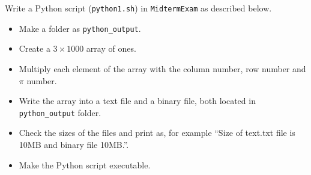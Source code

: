 \question[25]

Write a Python script (\texttt{python1.sh}) in \texttt{MidtermExam} as described below.
\begin{itemize}
\item Make a folder as \texttt{python\_output}.
\item Create a $3\times1000$ array of ones.
\item Multiply each element of the array with the column number, row number and $\pi$ number.
\item Write the array into a text file and a binary file, both located in \texttt{python\_output} folder.
\item Check the sizes of the files and print as, for example ``Size of text.txt file is 10MB and binary file 10MB.''.
\item Make the Python script executable.
\end{itemize}


